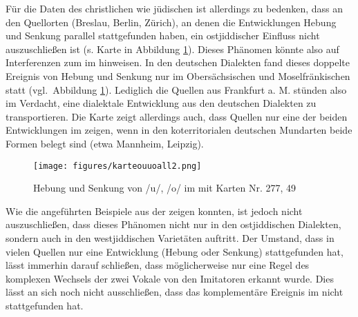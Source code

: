 Für die Daten des christlichen wie jüdischen \hai{{\LiJieins}} ist allerdings zu bedenken, dass an den Quellorten (Breslau, Berlin, Zürich), an denen die Entwicklungen Hebung und Senkung parallel stattgefunden haben, ein ostjiddischer Einfluss nicht auszuschließen ist (s. Karte in Abbildung \ref{karteouuoall}). Dieses Phänomen könnte also auf Interferenzen zum \hai{{\OJ}} im \hai{{\LiJi}} hinweisen. In den deutschen Dialekten fand dieses doppelte Ereignis von Hebung und Senkung nur im Obersächsischen und Moselfränkischen statt (vgl.\, Abbildung \ref{karteouuoall}). Lediglich die Quellen aus Frankfurt a. M. stünden also im Verdacht, eine dialektale Entwicklung aus den deutschen Dialekten zu transportieren. Die Karte zeigt allerdings auch, dass Quellen nur eine der beiden Entwicklungen im  zeigen, wenn in den koterritorialen deutschen Mundarten beide Formen belegt sind (etwa Mannheim, Leipzig).
		
\begin{figure}
		\centering
\texttt{[image: figures/karteouuoall2.png]}
		\caption{\label{karteouuoall} Hebung und Senkung von /u/, /o/ im  mit  Karten Nr. 277, 49}
		\end{figure}

		

Wie die angeführten Beispiele aus der  zeigen konnten, ist jedoch nicht auszuschließen, dass dieses Phänomen nicht nur in den ostjiddischen Dialekten, sondern auch in den westjiddischen Varietäten auftritt. Der Umstand, dass in vielen Quellen nur eine Entwicklung (Hebung oder Senkung) stattgefunden hat, lässt immerhin darauf schließen, dass möglicherweise nur eine Regel des komplexen Wechsels der zwei Vokale von den Imitatoren erkannt wurde. Dies lässt an sich noch nicht ausschließen, dass das komplementäre Ereignis im \hai{{\WJ}} nicht stattgefunden hat.

